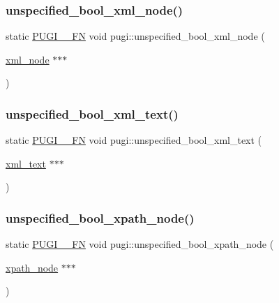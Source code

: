 \subsubsection{\texorpdfstring{unspecified\+\_\+bool\+\_\+xml\+\_\+node()}{unspecified\_bool\_xml\_node()}}
{\footnotesize\ttfamily static \hyperlink{pugixml_8cpp_a82c335af3ca48cdb209c506bf8dd6ad2}{P\+U\+G\+I\+\_\+\+\_\+\+FN} void pugi\+::unspecified\+\_\+bool\+\_\+xml\+\_\+node (\begin{DoxyParamCaption}\item[{\hyperlink{classpugi_1_1xml__node}{xml\+\_\+node} $\ast$$\ast$$\ast$}]{ }\end{DoxyParamCaption})\hspace{0.3cm}{\ttfamily [static]}}

\mbox{\label{namespacepugi_acfae514de3abac05ed155e531a401c15}} 
\subsubsection{\texorpdfstring{unspecified\+\_\+bool\+\_\+xml\+\_\+text()}{unspecified\_bool\_xml\_text()}}
{\footnotesize\ttfamily static \hyperlink{pugixml_8cpp_a82c335af3ca48cdb209c506bf8dd6ad2}{P\+U\+G\+I\+\_\+\+\_\+\+FN} void pugi\+::unspecified\+\_\+bool\+\_\+xml\+\_\+text (\begin{DoxyParamCaption}\item[{\hyperlink{classpugi_1_1xml__text}{xml\+\_\+text} $\ast$$\ast$$\ast$}]{ }\end{DoxyParamCaption})\hspace{0.3cm}{\ttfamily [static]}}

\mbox{\label{namespacepugi_abca519e72b848d2ebadf5250727da6c5}} 
\subsubsection{\texorpdfstring{unspecified\+\_\+bool\+\_\+xpath\+\_\+node()}{unspecified\_bool\_xpath\_node()}}
{\footnotesize\ttfamily static \hyperlink{pugixml_8cpp_a82c335af3ca48cdb209c506bf8dd6ad2}{P\+U\+G\+I\+\_\+\+\_\+\+FN} void pugi\+::unspecified\+\_\+bool\+\_\+xpath\+\_\+node (\begin{DoxyParamCaption}\item[{\hyperlink{classpugi_1_1xpath__node}{xpath\+\_\+node} $\ast$$\ast$$\ast$}]{ }\end{DoxyParamCaption})\hspace{0.3cm}{\ttfamily [static]}}

